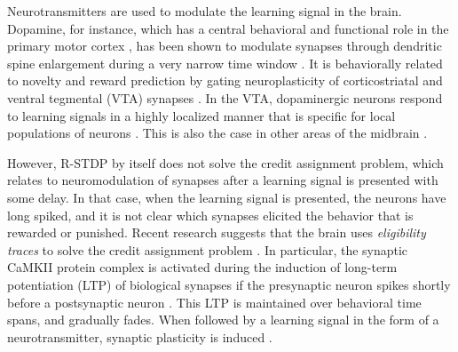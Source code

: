 	Neurotransmitters are used to modulate the learning signal in the brain.
	Dopamine, for instance, which has a central behavioral and functional role in the primary motor cortex \citep{barnes2005activity,dang2006disrupted}, has been shown to modulate synapses through dendritic spine enlargement during a very narrow time window \citep{dang2006disrupted}.
	It is behaviorally related to novelty and reward prediction \citep{li2003dopamine,schultz2007behavioral} by gating neuroplasticity of corticostriatal \citep{reynolds2001cellular,reynolds2002dopamine} and ventral tegmental (VTA) synapses \citep{bao2001cortical}.
	In the VTA, dopaminergic neurons respond to learning signals in a highly localized manner that is specific for local populations of neurons \citep{engelhard2019specialized}.
	This is also the case in other areas of the midbrain \citep{roeper2013dissecting}.

	However, R-STDP by itself does not solve the credit assignment problem, which relates to neuromodulation of synapses after a learning signal is presented with some delay.
	In that case, when the learning signal is presented, the neurons have long spiked, and it is not clear which synapses elicited the behavior that is rewarded or punished.
	Recent research suggests that the brain uses \emph{eligibility traces} \citep{izhikevich2007solving,florian2007reinforcement} to solve the credit assignment problem \citep{stolyarova2018solving,gerstner2018eligibility}.
	In particular, the synaptic CaMKII protein complex is activated during the induction of long-term potentiation (LTP) of biological synapses if the presynaptic neuron spikes shortly before a postsynaptic neuron \citep{sanhueza2013camkii}.
	This LTP is maintained over behavioral time spans, and gradually fades.
	When followed by a learning signal in the form of a neurotransmitter, synaptic plasticity is induced \citep{yagishita2014critical,cassenaer2012conditional,gerstner2018eligibility}.

